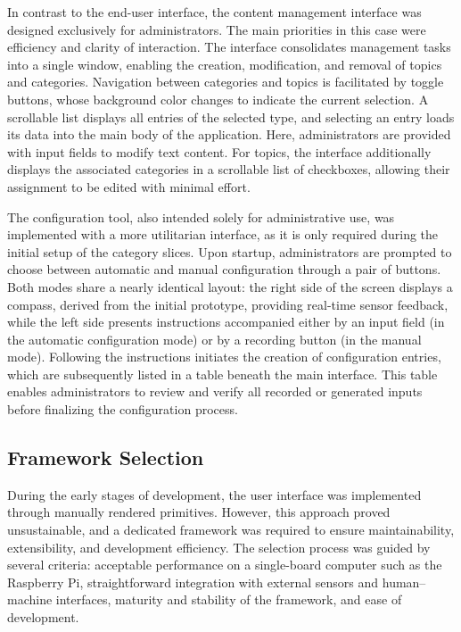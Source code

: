 In contrast to the end-user interface, the content management interface was designed exclusively for administrators. The main priorities in this case were efficiency and clarity of interaction. The interface consolidates management tasks into a single window, enabling the creation, modification, and removal of topics and categories. Navigation between categories and topics is facilitated by toggle buttons, whose background color changes to indicate the current selection. A scrollable list displays all entries of the selected type, and selecting an entry loads its data into the main body of the application. Here, administrators are provided with input fields to modify text content. For topics, the interface additionally displays the associated categories in a scrollable list of checkboxes, allowing their assignment to be edited with minimal effort.

The configuration tool, also intended solely for administrative use, was implemented with a more utilitarian interface, as it is only required during the initial setup of the category slices. Upon startup, administrators are prompted to choose between automatic and manual configuration through a pair of buttons. Both modes share a nearly identical layout: the right side of the screen displays a compass, derived from the initial prototype, providing real-time sensor feedback, while the left side presents instructions accompanied either by an input field (in the automatic configuration mode) or by a recording button (in the manual mode). Following the instructions initiates the creation of configuration entries, which are subsequently listed in a table beneath the main interface. This table enables administrators to review and verify all recorded or generated inputs before finalizing the configuration process.


\subsection{Framework Selection}
During the early stages of development, the user interface was implemented through manually rendered primitives. However, this approach proved unsustainable, and a dedicated framework was required to ensure maintainability, extensibility, and development efficiency. The selection process was guided by several criteria: acceptable performance on a single-board computer such as the Raspberry Pi, straightforward integration with external sensors and human–machine interfaces, maturity and stability of the framework, and ease of development.

